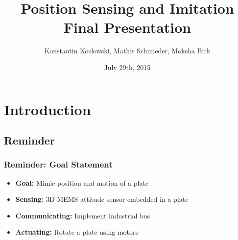 \documentclass{beamer}
\title[NES Project: Final Presentation]{Position Sensing and Imitation\\Final Presentation}
\author[Koslowski, Schmieder, Birk]{Konstantin Koslowski, Mathis Schmieder, Moksha Birk}
\institute[]
{TU Berlin \\
 Department of Telecommunication Systems \\
 Telecommunication Networks Group \\
}
\date{July 29th, 2015}
\begin{document}
\begin{frame}
  \titlepage
\end{frame}

\section{Introduction}
\subsection{Reminder}

\begin{frame}
  \frametitle{Reminder: Goal Statement}
  \begin{itemize}
    \item \textbf{Goal:} Mimic position and motion of a plate
    \vfill
    \item \textbf{Sensing:} 3D MEMS attitude sensor embedded in a plate
    \item \textbf{Communicating:} Implement industrial bus
    \item \textbf{Actuating:} Rotate a plate using motors
  \end{itemize}
\end{frame}
\end{document}
